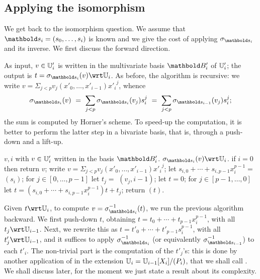 \subsection{Applying the isomorphism}

We get back to the isomorphism question. We assume that
$\lst{s}_i=(s_0,\dots,s_i)$ is known and we give the cost of applying
$\sigma_{\lst{s}_i}$ and its inverse.  We first discuss the forward
direction.

As input, $v \in \mathbb{U}'_i$ is written in the multivariate basis $\basis{B}'_i$
of $\mathbb{U}'_i$; the output is $t=\sigma_{\lst{s}_i}(v) \wrt \U_i$. As before,
the algorithm is recursive: we write $v=\Sigma_{j <p}
v_j(x'_0,\dots,x'_{i-1}) {x'_i}^j$, whence
\begin{equation}
  \sigma_{\lst{s}_i}(v)\ =\ \sum_{j
    <p} \sigma_{\lst{s}_i}(v_j) s_i^j\ =\ \sum_{j
    <p} \sigma_{\lst{s}_{i-1}}(v_j) s_i^j
  \text{;}
\end{equation}
the sum is computed by Horner's scheme.  To speed-up the computation,
it is better to perform the latter step in a bivariate basis, that is,
through a push-down and a lift-up.


\begin{algorithm}
  \caption{} 
  \label{alg:applyisomorphism}
  \begin{algorithmic}[1]
    \REQUIRE $v,i$ with $v\in \mathbb{U}'_i$ written in the basis $\basis{B}'_i$.
    \ENSURE $\sigma_{\lst{s}_i}(v) \wrt \U_i$.
    \STATE if $i=0$ then return $v$;
    \STATE write $v=\Sigma_{j <p} v_j(x'_0,\dots,x'_{i-1}) {x'_i}^j$;
    \STATE let $s_{i,0}+\cdots+s_{i,p-1}x_i^{p-1}=$ $(s_i)$;
    \STATE for $j \in [0,\dots,p-1]$ let $t_j=$ $(v_j,i-1)$;
    \STATE let $t=0$;
    \STATE  for $j \in [p-1,\dots,0]$ let $t=(s_{i,0}+\cdots+s_{i,p-1}x_i^{p-1})t+t_j$;
    \STATE return $(t)$.
  \end{algorithmic}
\end{algorithm}

Given $t \wrt \U_i$, to compute $v=\sigma_{\lst{s}_i}^{-1}(t)$, we run
the previous algorithm backward. We first push-down $t$, obtaining
$t=t_0 + \cdots + t_{p-1}x_i^{p-1}$, with all $t_j \wrt
\U_{i-1}$. Next, we rewrite this as $t=t'_0+\cdots +
t'_{p-1}s_i^{p-1}$, with all $t'_j \wrt \U_{i-1}$, and it suffices to
apply $\sigma_{\lst{s}_i}^{-1}$ (or equivalently
$\sigma_{\lst{s}_{i-1}}^{-1}$) to each $t'_i$. The non-trivial part is
the computation of the $t'_j$'s: this is done by another application
of  in the extension
 $\mathbb{U}_i= \mathbb{U}_{i-1}[X_i]/(P_i)$, that we
shall call . We shall
discuss  later, for the
moment we just state a result about its complexity.

